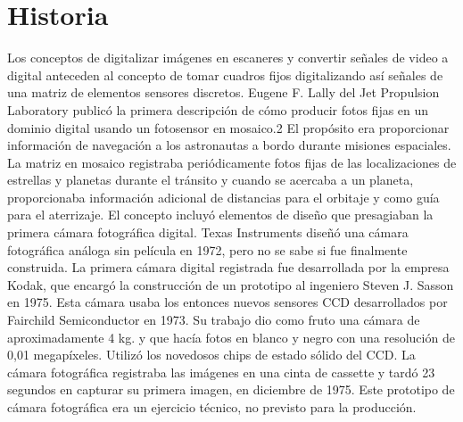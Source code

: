 \documentclass[12pt,a4paper]{report}
\begin{document}
\section{Historia}

Los conceptos de digitalizar imágenes en escaneres y convertir señales de video
a digital anteceden al concepto de tomar cuadros fijos digitalizando así señales
de una matriz de elementos sensores discretos. Eugene F. Lally del Jet
Propulsion Laboratory publicó la primera descripción de cómo producir fotos
fijas en un dominio digital usando un fotosensor en mosaico.2 El propósito era
proporcionar información de navegación a los astronautas a bordo durante
misiones espaciales. La matriz en mosaico registraba periódicamente fotos fijas
de las localizaciones de estrellas y planetas durante el tránsito y cuando se
acercaba a un planeta, proporcionaba información adicional de distancias para el
orbitaje y como guía para el aterrizaje. El concepto incluyó elementos de diseño
que presagiaban la primera cámara fotográfica digital.
Texas Instruments diseñó una cámara fotográfica análoga sin película en 1972,
pero no se sabe si fue finalmente construida. La primera cámara digital
registrada fue desarrollada por la empresa Kodak, que encargó la construcción de
un prototipo al ingeniero Steven J. Sasson en 1975. Esta cámara usaba los
entonces nuevos sensores CCD desarrollados por Fairchild Semiconductor en 1973.
Su trabajo dio como fruto una cámara de aproximadamente 4 kg. y que hacía fotos
en blanco y negro con una resolución de 0,01 megapíxeles. Utilizó los novedosos
chips de estado sólido del CCD. La cámara fotográfica registraba las imágenes en
una cinta de cassette y tardó 23 segundos en capturar su primera imagen, en
diciembre de 1975. Este prototipo de cámara fotográfica era un ejercicio
técnico, no previsto para la producción.
\end{document}
